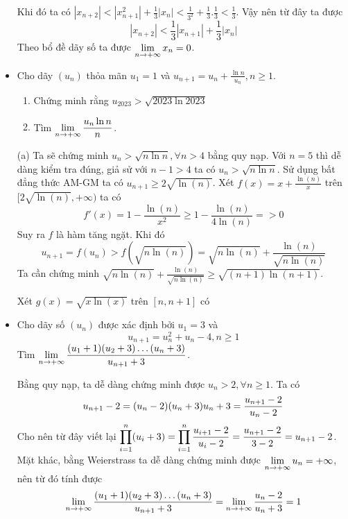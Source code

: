 \documentclass[11pt]{scrartcl}
\begin{document}
\begin{itemize}[label=, leftmargin=0em, itemsep=0.5em]
\begin{sol}
        Khi đó ta có $|x_{n + 2}| < |x_{n + 1}^2| + \frac{1}{3}|x_n| < \frac{1}{3^2} + \frac{1}{3}.\frac{1}{3} < \frac{1}{3}$. Vậy nên từ đây ta được 
        \[
         |x_{n + 2}| < \frac{1}{3}|x_{n + 1}| + \frac{1}{3}|x_n|
        \]
        Theo bổ đề dãy số ta được $\displaystyle\lim_{n \to +\infty} x_n = 0$.
    \end{sol}
    \item \begin{bt}
        Cho dãy $(u_n)$ thỏa mãn $u_1 = 1$ và $u_{n + 1} = u_n + \frac{\ln n}{u_n}, n \geq 1$.
        \begin{enumerate}[label=(\alph*)]
            \item Chứng minh rằng $u_{2023} > \sqrt{2023 \ln 2023}$
            \item Tìm $\dlim\frac{u_n  \ln n}{n}$.
        \end{enumerate}
    \end{bt}
    \begin{sol}
        (a) Ta sẽ chứng minh $u_n >\sqrt{n\ln n}, \forall n > 4$ bằng quy nạp. Với $n = 5$ thì dễ dàng kiểm tra đúng, giả sử với $n - 1 > 4$ ta có $u_{n} > \sqrt{n\ln n}$. Sử dụng bất đẳng thức AM-GM ta có $u_{n + 1} \geq 2\sqrt{\ln(n)}$. Xét $f(x) = x + \frac{\ln(n)}{x}$ trên $[2\sqrt{\ln(n)}, +\infty)$ ta có 
        \[
            f'(x) = 1 - \frac{\ln(n)}{x^2} \geq 1 - \frac{\ln(n)}{4\ln(n)} = > 0
        \]
        Suy ra $f$ là hàm tăng ngặt. Khi đó
        \[
            u_{n + 1} = f(u_n) > f(\sqrt{n\ln(n)}) = \sqrt{n\ln(n)} + \frac{\ln(n)}{\sqrt{n\ln(n)}}
        \]
        Ta cần chứng minh $\sqrt{n\ln(n)} + \frac{\ln(n)}{\sqrt{n\ln(n)}} \geq \sqrt{(n + 1)\ln(n + 1)}$.

        Xét $g(x) = \sqrt{x\ln(x)}$ trên $[n, n+ 1]$ có 
    \end{sol}
    \item \begin{bt}
        Cho dãy số $(u_n)$ được xác định bởi $u_1 = 3$ và $$u_{n + 1} = u_n^2 + u_n - 4, n \geq 1$$ Tìm $\dlim\frac{(u_1 + 1)(u_2 + 3)\dots(u_n + 3)}{u_{n + 1} +3}$.
    \end{bt}
    \begin{sol}
        Bằng quy nạp, ta dễ dàng chứng minh được $u_n > 2, \forall n \geq 1$. Ta có 
        \[
            u_{n + 1} - 2 = (u_n - 2)(u_n + 3) \lra u_n + 3 = \frac{u_{n + 1} - 2}{u_n - 2}
        \]
        Cho nên từ đây viết lại $\dprod_{i = 1}^n (u_i + 3) = \dprod_{i = 1}^n \frac{u_{i + 1} - 2}{u_i - 2} = \frac{u_{n + 1} - 2}{3- 2} = u_{n + 1} - 2$. Mặt khác, bằng Weierstrass ta dễ dàng chứng minh được $\displaystyle\lim_{n \to +\infty} u_n = +\infty$, nên từ đó tính được \[\dlim\frac{(u_1 + 1)(u_2 + 3)\dots(u_n + 3)}{u_{n + 1} +3} = \dlim \frac{u_n - 2}{u_n + 3} = 1\]
    \end{sol}


\end{itemize}
\end{document}

